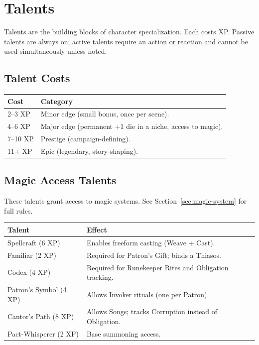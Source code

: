 
\section{Talents}

Talents are the building blocks of character specialization. Each costs XP. Passive talents are always on; active talents require an action or reaction and cannot be used simultaneously unless noted.

\subsection{Talent Costs}

\begin{tabular}{@{}ll@{}}
\toprule
\textbf{Cost} & \textbf{Category} \\
\midrule
2–3 XP & Minor edge (small bonus, once per scene). \\
4–6 XP & Major edge (permanent +1 die in a niche, access to magic). \\
7–10 XP & Prestige (campaign-defining). \\
11+ XP & Epic (legendary, story-shaping). \\
\bottomrule
\end{tabular}

\subsection{Magic Access Talents}

These talents grant access to magic systems. See Section~\ref{sec:magic-system} for full rules.

\begin{tabular}{@{}lp{10cm}@{}}
\toprule
\textbf{Talent} & \textbf{Effect} \\
\midrule
Spellcraft (6 XP) & Enables freeform casting (Weave + Cast). \\
Familiar (2 XP) & Required for Patron's Gift; binds a Thiasos. \\
Codex (4 XP) & Required for Runekeeper Rites and Obligation tracking. \\
Patron's Symbol (4 XP) & Allows Invoker rituals (one per Patron). \\
Cantor's Path (8 XP) & Allows Songs; tracks Corruption instead of Obligation. \\
Pact-Whisperer (2 XP) & Base summoning access. \\
\bottomrule
\end{tabular}

